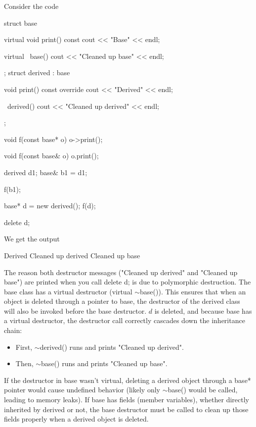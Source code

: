 \documentclass{report}
\begin{document}
    \pagebreak 
    \bigbreak \noindent 
    Consider the code
    \bigbreak \noindent 
    \begin{cppcode}
        struct base {
            virtual void print() const {
                cout << "Base" << endl;
            }

            virtual ~base() {
                cout << "Cleaned up base" << endl;
            }
        };
        struct derived : base {
            void print() const override {
                cout << "Derived" << endl;
            }

            ~derived() {
                cout << "Cleaned up derived" << endl;
            }
        };

        void f(const base* o) {
            o->print();
        }

        void f(const base& o) {
            o.print();
        }

        derived d1;
        base& b1 = d1;

        f(b1);

        base* d = new derived();
        f(d);

        delete d;
    \end{cppcode}
    \bigbreak \noindent 
    We get the output
    \bigbreak \noindent 
    \begin{cppcode}
        Derived
        Cleaned up derived
        Cleaned up base
    \end{cppcode}
    \bigbreak \noindent 
    The reason both destructor messages ("Cleaned up derived" and "Cleaned up base") are printed when you call delete d; is due to polymorphic destruction.
    \bigbreak \noindent 
    The base class has a virtual destructor (virtual $\sim$base()). This ensures that when an object is deleted through a pointer to base, the destructor of the derived class will also be invoked before the base destructor.
    \bigbreak \noindent 
    $d$ is deleted, and because base has a virtual destructor, the destructor call correctly cascades down the inheritance chain:
    \begin{itemize}
        \item First, $\sim$derived() runs and prints "Cleaned up derived".
        \item Then, $\sim$base() runs and prints "Cleaned up base".
    \end{itemize}
    \bigbreak \noindent 
    If the destructor in base wasn't virtual, deleting a derived object through a base* pointer would cause undefined behavior (likely only $\sim$base() would be called, leading to memory leaks).
    \bigbreak \noindent 
    If base has fields (member variables), whether directly inherited by derived or not, the base destructor must be called to clean up those fields properly when a derived object is deleted.
\end{document}
